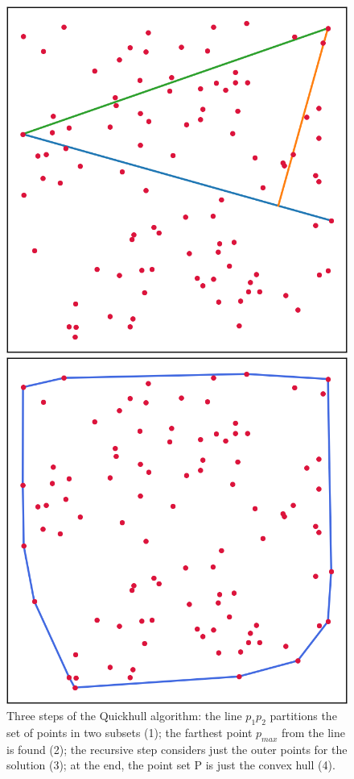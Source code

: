 \documentclass[]{finalproject}
\begin{document}
\begin{figure}[H]
\begin{minipage}{.245\linewidth}
	\end{minipage}
  \begin{minipage}{.245\linewidth}
		\includegraphics[width=\linewidth]{quickhull3.png}
	\end{minipage}
  \begin{minipage}{.245\linewidth}
		\includegraphics[width=\linewidth]{quickhull4.png}
	\end{minipage}
    \caption{Three steps of the Quickhull algorithm: the line $p_1p_2$ partitions the set of points in two subsets (1); the farthest point $p_{max}$ from the line is found (2); the recursive step considers just the outer points for the solution (3); at the end, the point set P is just the convex hull (4).}
    \label{fig:qh-steps}
\end{figure}
\end{document}

